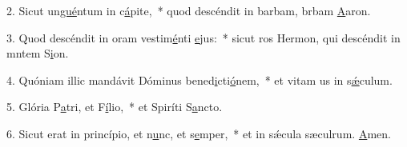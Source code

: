 2. Sicut un\uline{gué}ntum in c\uline{á}pite,~* quod descéndit in barbam, brbam \uline{A}aron.\par 
3. Quod descéndit in oram vestim\uline{é}nti \uline{e}jus:~* sicut ros Hermon, qui descéndit in mntem S\uline{i}on.\par 
4. Quóniam illic mandávit Dóminus bened\uline{i}cti\uline{ó}nem,~* et vitam us in s\uline{ǽ}culum.\par 
5. Glória P\uline{a}tri, et F\uline{í}lio,~* et Spiríti S\uline{a}ncto.\par 
6. Sicut erat in princípio, et n\uline{u}nc, et s\uline{e}mper,~* et in sǽcula sæculrum. \uline{A}men.\par 
